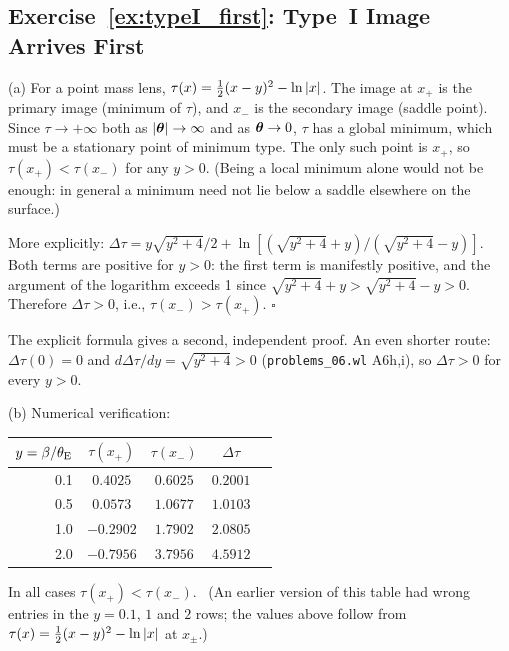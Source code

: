 \subsection*{Exercise~\ref{ex:typeI_first}: Type~I Image Arrives First}

(a) For a point mass lens, $\tau(x) = \tfrac{1}{2}(x - y)^2 - \ln|x|$.
The image at $x_+$ is the primary image (minimum of $\tau$), and
$x_-$ is the secondary image (saddle point).  Since $\tau\to+\infty$
both as $|\boldsymbol{\theta}|\to\infty$ and as $\boldsymbol{\theta}\to0$, $\tau$ has a global
minimum, which must be a stationary point of minimum type.  The only such
point is $x_+$, so $\tau(x_+)<\tau(x_-)$ for any $y>0$.  (Being a local
minimum alone would not be enough: in general a minimum need not lie below
a saddle elsewhere on the surface.)

More explicitly: $\Delta\tau = y\sqrt{y^2+4}/2 +
\ln[(\sqrt{y^2+4}+y)/(\sqrt{y^2+4}-y)]$.  Both terms are positive for
$y > 0$: the first term is manifestly positive, and the argument of the
logarithm exceeds 1 since $\sqrt{y^2+4} + y > \sqrt{y^2+4} - y > 0$.
Therefore $\Delta\tau > 0$, i.e., $\tau(x_-) > \tau(x_+)$.
\hfill $\square$

\begin{annotation}
The explicit formula gives a second, independent proof.  An even shorter
route: $\Delta\tau(0) = 0$ and $d\Delta\tau/dy = \sqrt{y^2+4}>0$
(\texttt{problems\_06.wl} A6h,i), so $\Delta\tau>0$ for every $y>0$.
\end{annotation}

(b) Numerical verification:

\begin{center}
\begin{tabular}{rcccc}
\toprule
$y = \beta/\theta_{\mathrm{E}}$ & $\tau(x_+)$ & $\tau(x_-)$ & $\Delta\tau$ \\
\midrule
0.1  & $0.4025$  & $0.6025$  & $0.2001$ \\
0.5  & $0.0573$  & $1.0677$  & $1.0103$ \\
1.0  & $-0.2902$ & $1.7902$  & $2.0805$ \\
2.0  & $-0.7956$ & $3.7956$  & $4.5912$ \\
\bottomrule
\end{tabular}
\end{center}

In all cases $\tau(x_+) < \tau(x_-)$.  \checkmark\ (An earlier version of
this table had wrong entries in the $y=0.1$, $1$ and $2$ rows; the values
above follow from $\tau(x)=\tfrac{1}{2}(x-y)^2-\ln|x|$ at $x_\pm$.)

